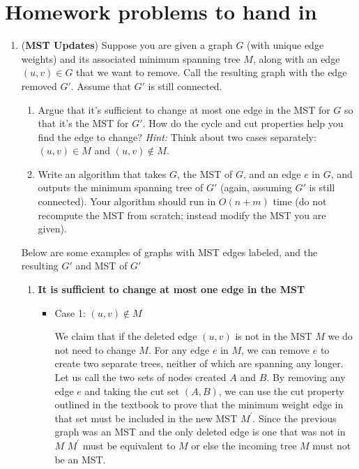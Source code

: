 \documentclass[letterpaper,11pt]{article}
\begin{document}
\section*{Homework problems to hand in}
\newpage
\begin{enumerate}
    \item (\textbf{MST Updates}) Suppose you are given a graph $G$ (with unique edge weights) and its associated minimum spanning tree $M$, along with an edge $(u,v)\in G$ that we want to remove. Call the resulting graph with the edge removed $G'$. Assume that $G'$ is still connected. 

    \begin{enumerate}
        \item Argue that it's sufficient to change at most one edge in the MST for $G$ so that it's the MST for $G'$. How do the cycle and cut properties help you find the edge to change? \textit{Hint:} Think about two cases separately: $(u,v) \in M$ and $(u,v) \notin M$.

        \item Write an algorithm that takes $G$, the MST of $G$, and an edge $e$ in $G$, and outputs the minimum spanning tree of $G'$ (again, assuming $G'$ is still connected). Your algorithm should run in $O(n+m)$ time (do not recompute the MST from scratch; instead modify the MST you are given).
    \end{enumerate}
    
    Below are some examples of graphs with MST edges labeled, and the resulting $G'$ and MST of $G'$
    
    \begin{enumerate}
        \color{teal}
        \item \textbf{It is sufficient to change at most one edge in the MST}
            \begin{itemize}
                \item Case 1: $(u, v)\not\in M$

                    We claim that if the deleted edge $(u, v)$ is not in the MST $M$
                we do not need to change $M$. For any edge $e$ in $M$, we can 
                remove $e$ to create two separate trees, neither of which are 
                spanning any longer. Let us call the two sets of nodes created
                $A$ and $B$. By removing any edge $e$ and taking the cut set 
                $(A, B)$, we can use the cut property outlined in the textbook
                to prove that the minimum weight edge in that set must be included
                in the new MST $M^{\prime}$. Since the previous graph was an
                MST and the only deleted edge is one that was not in $M$ 
                $M^{\prime}$ must be equivalent to $M$ or else the incoming 
                tree $M$ must not be an MST.


\end{itemize}
\end{enumerate}
\end{enumerate}
\end{document}
